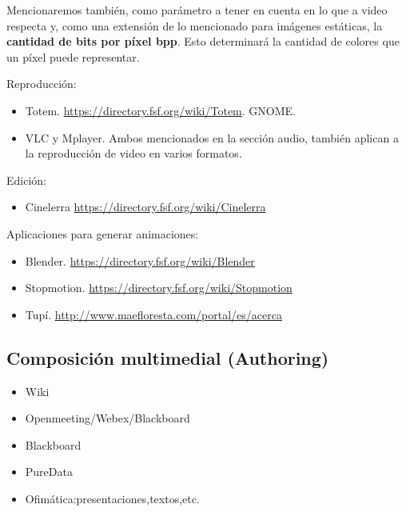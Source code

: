 \documentclass[12pt]{article}
\begin{document}
Mencionaremos también, como parámetro a tener en cuenta en lo que a video respecta
y, como una extensión de lo mencionado para imágenes estáticas, la {\bf cantidad de 
bits por píxel bpp}. Esto determinará la cantidad de colores que un píxel 
puede representar. 



Reproducción:
\begin{itemize}
\item Totem.   \url{https://directory.fsf.org/wiki/Totem}. GNOME. 
\item VLC y Mplayer.  Ambos mencionados en la sección audio, también aplican 
a la reproducción de video en varios formatos.  
\end{itemize}

Edición:
\begin{itemize}
\item Cinelerra \url{https://directory.fsf.org/wiki/Cinelerra}
\end{itemize}

Aplicaciones para generar animaciones:
\begin{itemize}
\item Blender. \url{https://directory.fsf.org/wiki/Blender}
\item Stopmotion. \url{https://directory.fsf.org/wiki/Stopmotion}
\item Tupí.    \url{http://www.maefloresta.com/portal/es/acerca}
\end{itemize}

\subsection*{Composición multimedial (Authoring)}

\begin{itemize}
\item{Wiki}
\item{Openmeeting/Webex/Blackboard}
\item{Blackboard}
\item{PureData}
\item{Ofimática:presentaciones,textos,etc.}
\end{itemize}
\end{document}

